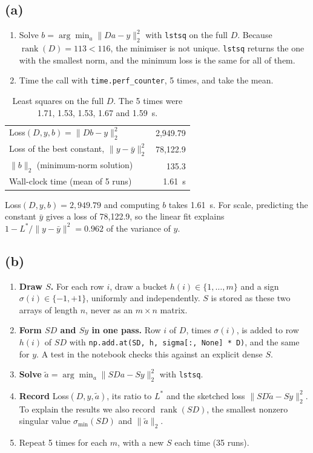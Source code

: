 \subsection*{(a)}

\begin{enumerate}
    \item Solve $b = \arg\min_a \|Da-y\|_2^2$ with \texttt{lstsq} on the full $D$. Because
    $\operatorname{rank}(D) = 113 < 116$, the minimiser is not unique. \texttt{lstsq} returns the one with
    the smallest norm, and the minimum loss is the same for all of them.
    \item Time the call with \texttt{time.perf\_counter}, 5 times, and take the mean.
\end{enumerate}

\begin{table}[H]
\centering
\begin{tabular}{lr}
\toprule
Loss$(D,y,b) = \|Db-y\|_2^2$ & 2{,}949.79 \\
Loss of the best constant, $\|y-\bar y\|_2^2$ & 78{,}122.9 \\
$\|b\|_2$ (minimum-norm solution) & 135.3 \\
Wall-clock time (mean of 5 runs) & 1.61~s \\
\bottomrule
\end{tabular}
\caption{Least squares on the full $D$. The 5 times were 1.71, 1.53, 1.53, 1.67 and 1.59~s.}
\end{table}

Loss$(D,y,b) = 2{,}949.79$ and computing $b$ takes 1.61~s. For scale, predicting the constant $\bar y$
gives a loss of 78{,}122.9, so the linear fit explains $1 - L^*/\|y-\bar y\|^2 = 0.962$ of the variance of $y$.

\subsection*{(b)}

\begin{enumerate}
    \item \textbf{Draw $S$.} For each row $i$, draw a bucket $h(i) \in \{1,\dots,m\}$ and a sign
    $\sigma(i) \in \{-1,+1\}$, uniformly and independently. $S$ is stored as these two arrays of length $n$,
    never as an $m \times n$ matrix.
    \item \textbf{Form $SD$ and $Sy$ in one pass.} Row $i$ of $D$, times $\sigma(i)$, is added to row $h(i)$ of
    $SD$ with \texttt{np.add.at(SD, h, sigma[:, None] * D)}, and the same for $y$. A test in the notebook checks
    this against an explicit dense $S$.
    \item \textbf{Solve} $\tilde a = \arg\min_a \|SDa-Sy\|_2^2$ with \texttt{lstsq}.
    \item \textbf{Record} Loss$(D,y,\tilde a)$, its ratio to $L^*$ and the sketched loss $\|SD\tilde a-Sy\|_2^2$.
    To explain the results we also record $\operatorname{rank}(SD)$, the smallest nonzero singular value
    $\sigma_{\min}(SD)$ and $\|\tilde a\|_2$.
    \item Repeat 5 times for each $m$, with a new $S$ each time (35 runs).
\end{enumerate}

